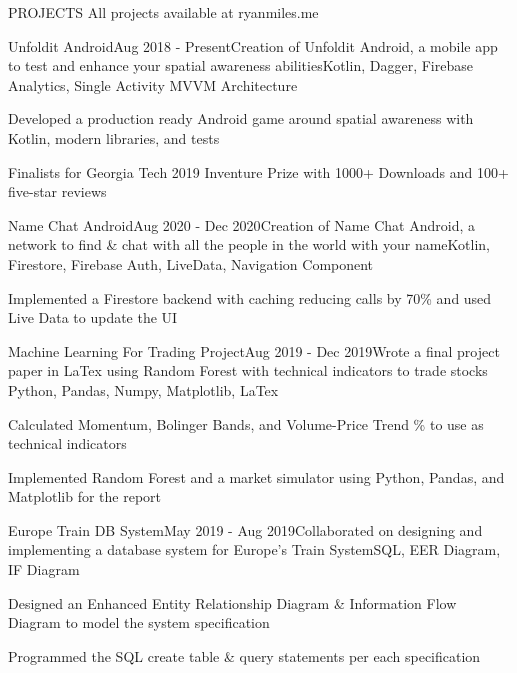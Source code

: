 \documentclass{resume} %
\begin{document}
\vspace{.3em}


\begin{rSectionProjects}{PROJECTS} {All projects available at ryanmiles.me}
	
	\begin{rSubsectionProjects}{Unfoldit Android}{Aug 2018 - Present}{Creation of Unfoldit Android, a mobile app to test and enhance your spatial awareness abilities}{Kotlin, Dagger, Firebase Analytics, Single Activity MVVM Architecture}
		\item Developed a production ready Android game around spatial awareness with Kotlin, modern libraries, and tests
		\item Finalists for Georgia Tech 2019 Inventure Prize with 1000+ Downloads and 100+ five-star reviews
		
	\end{rSubsectionProjects} 

\begin{rSubsectionProjects}{Name Chat Android}{Aug 2020 - Dec 2020}{Creation of Name Chat Android, a network to find \& chat with all the people in the world with your name}{Kotlin, Firestore, Firebase Auth, LiveData, Navigation Component}{}
	\item Implemented a Firestore backend with caching reducing calls by 70\% and used Live Data to update the UI
\end{rSubsectionProjects}

\begin{rSubsectionProjects}{Machine Learning For Trading Project}{Aug 2019 - Dec 2019}{Wrote a final project paper in LaTex using Random Forest with technical indicators to trade stocks }{Python, Pandas, Numpy, Matplotlib, LaTex} {}
	\item Calculated Momentum, Bolinger Bands, and Volume-Price Trend \% to use as technical indicators
	\item Implemented Random Forest and a market simulator using Python, Pandas, and Matplotlib for the report	
\end{rSubsectionProjects} 


\begin{rSubsectionProjects}{Europe Train DB System}{May 2019 - Aug 2019}{Collaborated on designing and implementing a database system for Europe's Train System}{SQL, EER Diagram, IF Diagram} {}
	\item Designed an Enhanced Entity Relationship Diagram \& Information Flow Diagram to model the system specification
	\item Programmed the SQL create table  \& query statements per each specification
	

\end{rSubsectionProjects}
\end{rSectionProjects}
\end{document}
